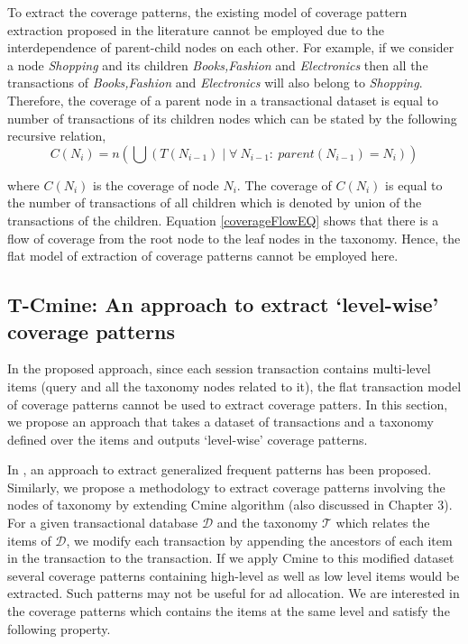 To extract the coverage patterns, the existing model of coverage pattern extraction proposed in the literature \cite{srinivas2014mining} cannot be employed due to the interdependence of parent-child nodes on each other. For example, if we consider a node \textit{Shopping} and its children \textit{Books,Fashion} and \textit{Electronics} then all the transactions of \textit{Books,Fashion} and \textit{Electronics} will also belong to \textit{Shopping}. Therefore, the coverage of a parent node in a transactional dataset is equal to number of transactions of its children nodes which can be stated by the following recursive relation, 
\begin{equation}
    \label{coverageFlowEQ}
    C(N_{i}) = n (\bigcup ( T(N_{i-1}) \mid \forall\ N_{i-1}:\  parent(N_{i-1}) = N_{i}))
\end{equation}


where $C(N_{i})$ is the coverage of node $N_{i}$. The coverage of $C(N_{i})$ is equal to the number of transactions of all children which is denoted by union of the transactions of the children. Equation \ref{coverageFlowEQ} shows that there is a flow of coverage from the root node to the leaf nodes in the taxonomy. Hence, the flat model of extraction of coverage patterns cannot be employed here. 




\subsection{T-Cmine: An approach to extract `level-wise' coverage patterns}

\label{Tcmine_algo}
In the proposed approach, since each session transaction contains multi-level items (query and all the taxonomy nodes related to it), the flat transaction model of coverage patterns cannot be used to extract coverage patters. In this section, we propose an approach that takes a dataset of transactions and a taxonomy defined over the items and outputs `level-wise' coverage patterns.



In \cite{srikant1997mining}, an approach to extract generalized frequent patterns has been proposed. Similarly, we propose a methodology to extract coverage patterns involving the nodes of taxonomy by extending Cmine algorithm \cite{srinivas2014mining} (also discussed in Chapter 3). For a given transactional database $\mathcal{D}$ and the taxonomy $\mathcal{T}$ which relates the items of $\mathcal{D}$, we modify each transaction by appending the ancestors of each item in the transaction to the transaction. If we apply Cmine to this modified dataset several coverage patterns containing high-level as well as low level items would be extracted. Such patterns may not be useful for ad allocation. We are interested in the coverage patterns which contains the items at the same level and satisfy the following property.

